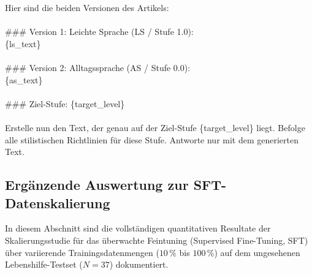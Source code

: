 \begin{tcolorbox}[colback=gray!5!white,colframe=gray!60!black,title=\textbf{User-Prompt-Template: Übergabe der Artikelpaare},sharp corners,boxrule=0.8pt,top=1.5mm,bottom=1.5mm,boxsep=1.5mm]
\linespread{1.0}\selectfont
\footnotesize\ttfamily
Hier sind die beiden Versionen des Artikels:\\
\\
\#\#\# Version 1: Leichte Sprache (LS / Stufe 1.0):\\
\{ls\_text\}\\
\\
\#\#\# Version 2: Alltagssprache (AS / Stufe 0.0):\\
\{as\_text\}\\
\\
\#\#\# Ziel-Stufe: \{target\_level\}\\
\\
Erstelle nun den Text, der genau auf der Ziel-Stufe \{target\_level\} liegt. Befolge alle stilistischen Richtlinien für diese Stufe. Antworte nur mit dem generierten Text.
\end{tcolorbox}

\subsection{Ergänzende Auswertung zur SFT-Datenskalierung}
\label{sec:anhang_sft_scaling}

In diesem Abschnitt sind die vollständigen quantitativen Resultate der Skalierungsstudie für das überwachte Feintuning (Supervised Fine-Tuning, SFT) über variierende Trainingsdatenmengen ($10\,\%$ bis $100\,\%$) auf dem ungesehenen Lebenshilfe-Testset ($N=37$) dokumentiert.

